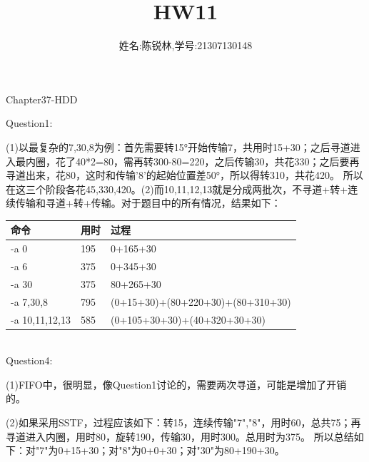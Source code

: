\documentclass[12pt]{article}
\title{HW11}
\author{姓名:陈锐林,学号:21307130148}
\begin{document}
\maketitle
\begin{large}
    \noindent Chapter37-HDD\\
\end{large}
Question1:\par
(1)以最复杂的7,30,8为例：首先需要转15°开始传输7，共用时15+30；之后寻道进入最内圈，花了40*2=80，需再转300-80=220，之后传输30，共花330；之后要再寻道出来，花80，这时和传输'8'的起始位置差50°，所以得转310，共花420。
所以在这三个阶段各花45,330,420。(2)而10,11,12,13就是分成两批次，不寻道+转+连续传输和寻道+转+传输。对于题目中的所有情况，结果如下：
\begin{tabular}{p{4cm}p{2cm}p{8cm}}  %
    \toprule[2pt]
    命令 & 用时 & 过程 \\ %
    \midrule[2pt]
    -a 0    & 195      & 0+165+30     \\
    -a 6    & 375 & 0+345+30 \\
    -a 30   & 375 & 80+265+30 \\
    -a 7,30,8     & 795 & (0+15+30)+(80+220+30)+(80+310+30) \\
    -a 10,11,12,13  & 585  & (0+105+30+30)+(40+320+30+30)\\
    \bottomrule[2pt]
\end{tabular}\\

\noindent Question4:\par
(1)FIFO中，很明显，像Question1讨论的，需要两次寻道，可能是增加了开销的。\par
(2)如果采用SSTF，过程应该如下：转15，连续传输"7","8"，用时60，总共75；再寻道进入内圈，用时80，旋转190，传输30，用时300。总用时为375。
所以总结如下：对"7"为0+15+30；对"8"为0+0+30；对"30"为80+190+30。\\
\end{document}
